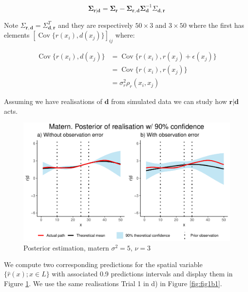 \documentclass[]{article}
\newcommand{\vect}[1]{\ensuremath{\boldsymbol{\mathbf{#1}}}}
\newcommand{\matr}[1]{\ensuremath{\boldsymbol{\mathbf{#1}}}}
\DeclareMathOperator{\Cov}{\text{Cov}}
\begin{document}
\begin{equation}
      \vect\Sigma_{\vect r | \vect d} = \matr \Sigma_{\vect r} - \matr \Sigma_{\vect r, \vect d} \matr \Sigma_{\vect d}^{-1}\Sigma_{\vect d, \vect r}
\end{equation}

Note \(\Sigma_{\vect r, \vect d} = \Sigma_{\vect d, \vect r}^T\) and
they are respectively \(50\times 3\) and \(3\times 50\) where the first
has elements \([\Cov\lbrace r(x_i), d(x_j)\rbrace]_{ij}\) where:

\begin{equation}
    \begin{split}
        \Cov\lbrace r(x_i), d(x_j)\rbrace &= \Cov\lbrace r(x_i), r(x_j) + \epsilon(x_j)\rbrace  \\
        &= \Cov\lbrace r(x_i), r(x_j)\rbrace \\ 
        &= \sigma_r^2\rho_r(x_i, x_j)
    \end{split}
\end{equation}

Assuming we have realisations of \(\vect d\) from simulated data we can
study how \(\vect r | \vect d\) acts.

\begin{figure}

{\centering \includegraphics{Exercise_1_files/figure-latex/fig1d1-1} 

}

\caption{\label{fig:fig1d1} Posterior estimation, matern $\sigma^2 = 5$, $\nu = 3$}\label{fig:fig1d1}
\end{figure}

We compute two corresponding predictions for the spatial variable
\(\lbrace \hat r(x);x \in L\rbrace\) with associated 0.9 predictions
intervals and display them in Figure \ref{fig:fig1d1}. We use the same
realisations Trial 1 in d) in Figure \ref{fig:fig1b1}.
\end{document}
